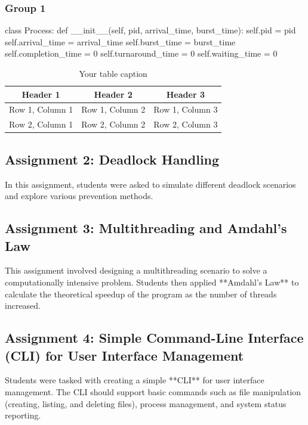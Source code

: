 \documentclass[12pt]{article}
\begin{document}
\subsubsection{Group 1}
\begin{python}
    class Process:
    def __init__(self, pid, arrival_time, burst_time):
        self.pid = pid
        self.arrival_time = arrival_time
        self.burst_time = burst_time
        self.completion_time = 0
        self.turnaround_time = 0
        self.waiting_time = 0
\end{python}

\begin{table}[htbp] %
    \centering
    \begin{tabular}{|c|c|c|} %
    \hline
    Header 1 & Header 2 & Header 3 \\ %
    \hline
    Row 1, Column 1 & Row 1, Column 2 & Row 1, Column 3 \\ %
    \hline
    Row 2, Column 1 & Row 2, Column 2 & Row 2, Column 3 \\ %
    \hline
    \end{tabular}
    \caption{Your table caption} %
    \label{tab:your_label} %
\end{table}
\subsection{Assignment 2: Deadlock Handling}
In this assignment, students were asked to simulate different deadlock scenarios and explore various prevention methods.

\subsection{Assignment 3: Multithreading and Amdahl's Law}
This assignment involved designing a multithreading scenario to solve a computationally intensive problem. Students then applied **Amdahl's Law** to calculate the theoretical speedup of the program as the number of threads increased.

\subsection{Assignment 4: Simple Command-Line Interface (CLI) for User Interface Management}
Students were tasked with creating a simple **CLI** for user interface management. The CLI should support basic commands such as file manipulation (creating, listing, and deleting files), process management, and system status reporting.
\end{document}

